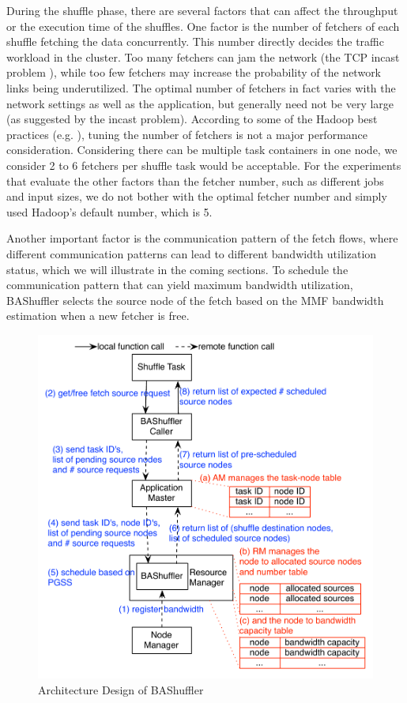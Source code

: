 \documentclass[10pt,journal,compsoc]{IEEEtran}
\begin{document}
During the shuffle phase, there are several factors that can
affect the throughput or the execution time of the shuffles.
One factor is the number of fetchers of each shuffle fetching the data
concurrently.
This number directly decides the traffic workload in the cluster. Too many
fetchers can jam the network (the TCP incast problem \cite{Phanishayee:2008:MAT}),
while too few fetchers may increase the probability of the network
links being underutilized. 
The optimal number of fetchers in fact varies with the network settings as well as the application, but generally need not be very large (as suggested by the incast problem). 
According to some of the Hadoop best practices (e.g. \cite{white2015hadoop}), tuning the number of fetchers is not a major performance consideration. 
Considering there can be multiple task containers in one node, we consider 2 to 6 fetchers per shuffle task would be acceptable. 
For the experiments that evaluate the other factors than the fetcher number, such as different jobs and input sizes, we do not bother with the optimal fetcher number and simply used Hadoop's default number, which is 5. 

Another important factor is the communication pattern of the fetch
flows, where different communication patterns can lead to different bandwidth utilization status, which we will illustrate in the coming sections.
To schedule the communication pattern that can yield maximum bandwidth
utilization, BAShuffler selects the source node of the fetch based on the MMF bandwidth estimation
when a new fetcher is free.

\begin{figure}
\centering

\includegraphics[width=1\columnwidth]{figure1}

\caption{Architecture Design of BAShuffler}
\label{fig:bashuffler}
\end{figure}
\end{document}
